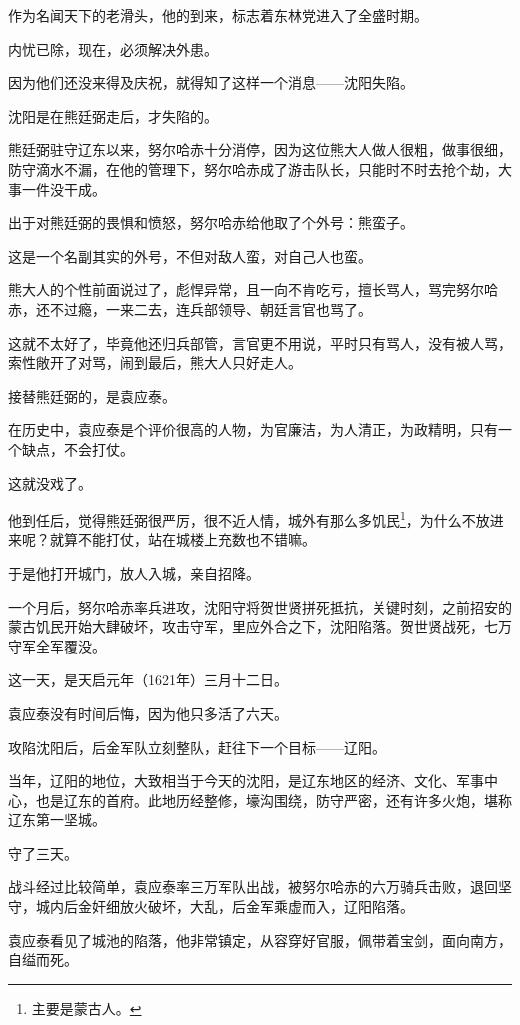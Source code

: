 \begin{multicols}{\theparacolNo}
		作为名闻天下的老滑头，他的到来，标志着东林党进入了全盛时期。

		内忧已除，现在，必须解决外患。

		因为他们还没来得及庆祝，就得知了这样一个消息——沈阳失陷。

		沈阳是在熊廷弼走后，才失陷的。

		熊廷弼驻守辽东以来，努尔哈赤十分消停，因为这位熊大人做人很粗，做事很细，防守滴水不漏，在他的管理下，努尔哈赤成了游击队长，只能时不时去抢个劫，大事一件没干成。

		出于对熊廷弼的畏惧和愤怒，努尔哈赤给他取了个外号：熊蛮子。

		这是一个名副其实的外号，不但对敌人蛮，对自己人也蛮。

		熊大人的个性前面说过了，彪悍异常，且一向不肯吃亏，擅长骂人，骂完努尔哈赤，还不过瘾，一来二去，连兵部领导、朝廷言官也骂了。

		这就不太好了，毕竟他还归兵部管，言官更不用说，平时只有骂人，没有被人骂，索性敞开了对骂，闹到最后，熊大人只好走人。

		接替熊廷弼的，是袁应泰。

		在历史中，袁应泰是个评价很高的人物，为官廉洁，为人清正，为政精明，只有一个缺点，不会打仗。

		这就没戏了。

		他到任后，觉得熊廷弼很严厉，很不近人情，城外有那么多饥民\footnote{主要是蒙古人。}，为什么不放进来呢？就算不能打仗，站在城楼上充数也不错嘛。

		于是他打开城门，放人入城，亲自招降。

		一个月后，努尔哈赤率兵进攻，沈阳守将贺世贤拼死抵抗，关键时刻，之前招安的蒙古饥民开始大肆破坏，攻击守军，里应外合之下，沈阳陷落。贺世贤战死，七万守军全军覆没。

		这一天，是天启元年（1621年）三月十二日。

		袁应泰没有时间后悔，因为他只多活了六天。

		攻陷沈阳后，后金军队立刻整队，赶往下一个目标——辽阳。

		当年，辽阳的地位，大致相当于今天的沈阳，是辽东地区的经济、文化、军事中心，也是辽东的首府。此地历经整修，壕沟围绕，防守严密，还有许多火炮，堪称辽东第一坚城。

		守了三天。

		战斗经过比较简单，袁应泰率三万军队出战，被努尔哈赤的六万骑兵击败，退回坚守，城内后金奸细放火破坏，大乱，后金军乘虚而入，辽阳陷落。

		袁应泰看见了城池的陷落，他非常镇定，从容穿好官服，佩带着宝剑，面向南方，自缢而死。


\end{multicols}
